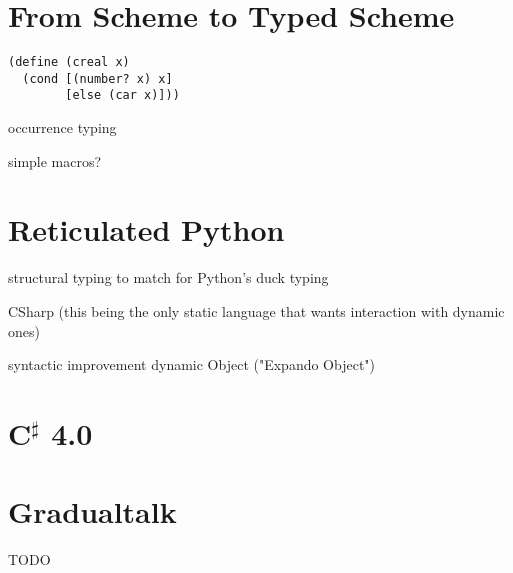 \section{From Scheme to Typed Scheme}



\begin{verbatim}
(define (creal x)
  (cond [(number? x) x]
        [else (car x)]))
\end{verbatim}

occurrence typing

simple macros?

\section{Reticulated Python}


structural typing to match for Python's duck typing

CSharp (this being the only static language that wants interaction with dynamic ones)

syntactic improvement
dynamic Object ("Expando Object")

\section{C$^\sharp$ 4.0}


\section{Gradualtalk}

TODO